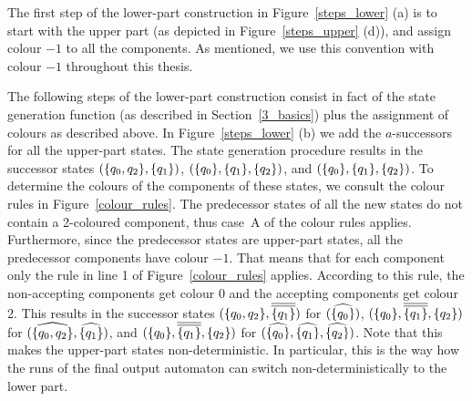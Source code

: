 The first step of the lower-part construction in Figure~\ref{steps_lower} (a) is to start with the upper part (as depicted in Figure~\ref{steps_upper} (d)), and assign colour $-1$ to all the components. As mentioned, we use this convention with colour $-1$ throughout this thesis.

The following steps of the lower-part construction consist in fact of the state generation function (as described in Section~\ref{3_basics}) plus the assignment of colours as described above. In Figure~\ref{steps_lower} (b) we add the $a$-successors for all the upper-part states. The state generation procedure results in the successor states $(\{q_{0},q_{2}\}, \{q_{1}\})$, $(\{q_{0}\}, \{q_{1}\}, \{q_{2}\})$, and $(\{q_{0}\}, \{q_{1}\}, \{q_{2}\})$. To determine the colours of the components of these states, we consult the colour rules in Figure~\ref{colour_rules}. The predecessor states of all the new states do not contain a 2-coloured component, thus case~A of the colour rules applies. Furthermore, since the predecessor states are upper-part states, all the predecessor components have colour $-1$. That means that for each component only the rule in line 1 of Figure~\ref{colour_rules} applies. According to this rule, the non-accepting components get colour 0 and the accepting components get colour 2. This results in the successor states $(\qqm02, \cl2{\qm1})$ for $(\cl^{\qm0})$, $(\qm0, \cl2{\qm1}, \qm2)$ for $(\cl^{\qqm02}, \cl^{\qm1})$, and $(\qm0, \cl2{\qm1}, \qm2)$ for $(\cl^{\qm0}, \cl^{\qm1}, \cl^{\qm2})$. Note that this makes the upper-part states non-deterministic. In particular, this is the way how the runs of the final output automaton can switch non-deterministically to the lower part. 


